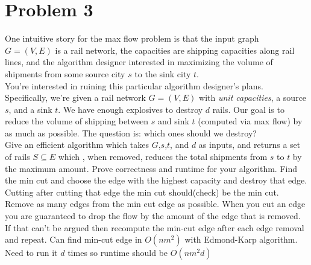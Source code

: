 \documentclass{article}
\begin{document}
\newpage
\section*{Problem 3}
One intuitive story for the max flow problem is that the input graph $G = (V,E)$ is a rail network, the capacities are shipping capacities along rail lines, and the algorithm designer interested in maximizing the volume of shipments from some source city $s$ to the sink city $t$.
\\
\indent You're interested in ruining this particular algorithm designer's plans.
Specifically, we're given a rail network $G = (V,E)$ with \emph{unit capacities}, a source $s$, and a sink $t$.
We have enough explosives to destroy $d$ rails.
Our goal is to reduce the volume of shipping between $s$ and sink $t$ (computed via max flow) by as much as possible.
The question is: which ones should we destroy?
\\
\indent Give an efficient algorithm which takes $G$,$s$,$t$, and $d$ as inputs, and returns a set of rails $S \subseteq E$ which , when removed, reduces the total shipments from $s$ to $t$ by the maximum amount.
Prove correctness and runtime for your algorithm.
\newline
\newline
\indent Find the min cut and choose the edge with the highest capacity and destroy that edge. Cutting after cutting that edge the min cut should(check) be the min cut. Remove as many edges from the min cut edge as possible. When you cut an edge you are guaranteed to drop the flow by the amount of the edge that is removed. If that can't be argued then recompute the min-cut edge after each edge removal and repeat. Can find min-cut edge in $O(nm^2)$ with Edmond-Karp algorithm. Need to run it $d$ times so runtime should be $O(nm^2d)$
\end{document}
